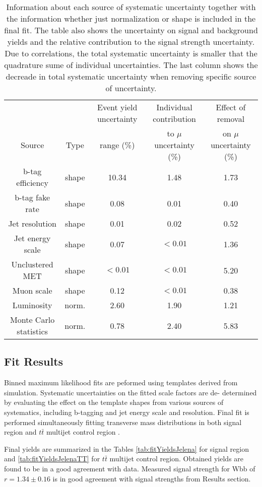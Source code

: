 \begin{table}[!htb]
\begin{center}
\begin{tabular}{ccccc} \hline \hline
&  & Event yield uncertainty &Individual contribution & Effect of removal  \\
Source & Type & range (\%) &  to $\mu$ uncertainty (\%) & on $\mu$ uncertainty (\%) \\ \hline
b-tag efficiency & shape &
10.34 & 1.48 & 1.73\\
b-tag fake rate & shape &
0.08 & 0.01 & 0.40\\
Jet resolution & shape &
0.01 & 0.02 & 0.52\\
Jet energy scale & shape &
0.07 & $<0.01$ & 1.36\\
Unclustered MET & shape &
$<0.01$ & $<0.01$ & 5.20\\
Muon scale & shape &
0.12 & $<0.01$ & 0.38\\
Luminosity & norm. &
2.60 & 1.90 & 1.21\\
Monte Carlo statistics & norm. &
0.78 & 2.40 & 5.83\\
\hline
\end{tabular}
\caption{Information about each source of systematic uncertainty together with the information whether just normalization or shape is included in the final fit. The table also shows the uncertainty on signal and background yields and the relative contribution to the signal strength uncertainty. Due to correlations, the total systematic uncertainty is smaller that the quadrature sume of individual uncertainties. The last column shows the decreade in total systematic uncertainty when removing specific source of uncertainty.}
\label{tab:systZG}
\end{center}
\end{table}
\subsection{Fit Results \label{sec:FitZagreb}}

Binned maximum likelihood fits are peformed using
templates derived from simulation. Systematic uncertainties on the fitted scale factors are de-
determined by evaluating the effect on the template shapes from various sources of systematics,
including b-tagging and jet energy scale and resolution.
Final fit is performed simultaneously fitting transverse mass distributions in both signal
region and $t\bar{t}$ multijet control region .

Final yields are summarized in the Tables \ref{tab:fitYieldsJelena} for signal region and \ref{tab:fitYieldsJelenaTT} for $t\bar{t}$ multijet control region.
Obtained yields are found to be in a good agreement with data. Measured signal strength for Wbb of $r = 1.34 \pm 0.16$ is in good agreement with signal strengths from Results section.

